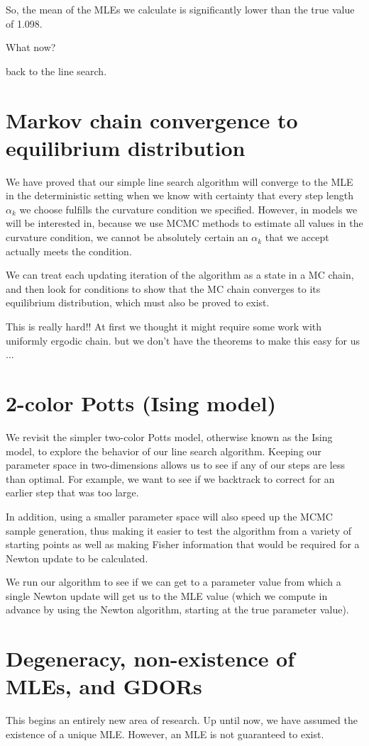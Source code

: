 \documentclass{amsbook}
\theoremstyle{definition}
\theoremstyle{remark}
\begin{document}
So, the mean of the MLEs we calculate is significantly lower than the true value of 
1.098.

What now?

back to the line search.

\section{Markov chain convergence to equilibrium distribution}
We have proved that our simple line search algorithm will converge to the MLE in the 
deterministic setting when we know with certainty that every step length $\alpha_k$ 
we choose fulfills the curvature condition we specified.  However, in models we will 
be interested in, because we use MCMC methods to estimate all values in the curvature 
condition, we cannot be absolutely certain an $\alpha_k$ that we accept actually 
meets the condition.  

We can treat each updating iteration of the algorithm as a state in a MC chain, and 
then look for conditions to show that the MC chain converges to its equilibrium 
distribution, which must also be proved to exist.

This is really hard!!  At first we thought it might require some work with uniformly 
ergodic chain.  but we don't have the theorems to make this easy for us ...

\section{2-color Potts (Ising model)}  
We revisit the simpler two-color Potts model, otherwise known as the Ising model, to 
explore the behavior of our line search algorithm.  Keeping our parameter space in 
two-dimensions allows us to see if any of our steps are less than optimal.  For 
example, we want to see if we backtrack to correct for an earlier step that was too 
large.  

In addition, using a smaller parameter space will also speed up the MCMC sample 
generation, thus making it easier to test the algorithm from a variety of starting 
points as well as making Fisher information that would be required for a Newton 
update to be calculated.

We run our algorithm to see if we can get to a parameter value from which a single 
Newton update will get us to the MLE value (which we compute in advance by using the 
Newton algorithm, starting at the true parameter value).

\newpage
\section{Degeneracy, non-existence of MLEs, and GDORs}
This begins an entirely new area of research.  Up until now, we have assumed the existence of a unique MLE.  However, an MLE is not guaranteed to exist.
\end{document}
